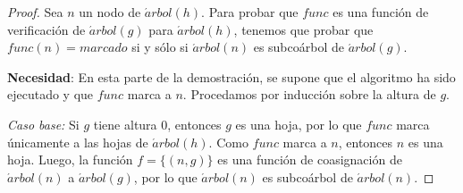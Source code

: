 \begin{proof}

    Sea $n$ un nodo de $\acute{a}rbol(h)$. Para probar que $func$ es una función
    de verificación de $\acute{a}rbol(g)$ para $\acute{a}rbol(h)$, tenemos que
    probar que $func(n) = marcado$ si y sólo si $\acute{a}rbol(n)$ es subcoárbol
    de $\acute{a}rbol(g)$.

    \textbf{Necesidad}: En esta parte de la demostración, se supone que el algoritmo ha sido ejecutado y que $func$ marca a $n$. Procedamos por inducción sobre la altura de $g$.

    \emph{Caso base:} Si $g$ tiene altura 0, entonces $g$ es una hoja, por lo
    que $func$ marca únicamente a las hojas de $\acute{a}rbol(h)$. Como $func$
    marca a $n$, entonces $n$ es una hoja. Luego, la función $f=\{(n,g)\}$ es
    una función de coasignación de $\acute{a}rbol(n)$ a $\acute{a}rbol(g)$, por
    lo que $\acute{a}rbol(n)$ es subcoárbol de $\acute{a}rbol(n)$.


\end{proof}
